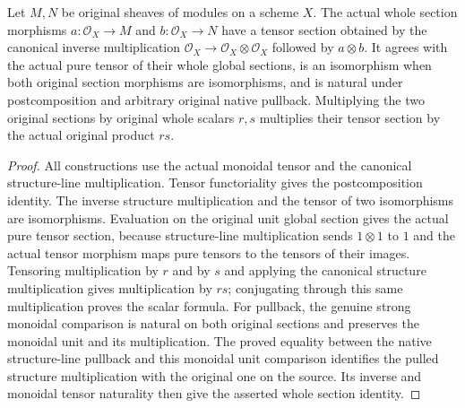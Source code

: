 \begin{lemma}
\label{lem:fc-original-tensor-section-homs}
\leanok
Let $M,N$ be original sheaves of modules on a scheme $X$. The actual
whole section morphisms $a:\mathcal O_X\to M$ and
$b:\mathcal O_X\to N$ have a tensor section obtained by the canonical
inverse multiplication $\mathcal O_X\to\mathcal O_X\otimes\mathcal O_X$
followed by $a\otimes b$. It agrees with the actual pure tensor of their
whole global sections, is an isomorphism when both original section
morphisms are isomorphisms, and is natural under postcomposition and
arbitrary original native pullback. Multiplying the two original
sections by original whole scalars $r,s$ multiplies their tensor section
by the actual original product $rs$.
\end{lemma}
\begin{proof}
All constructions use the actual monoidal tensor and the canonical
structure-line multiplication. Tensor functoriality gives the
postcomposition identity. The inverse structure multiplication and the
tensor of two isomorphisms are isomorphisms. Evaluation on the original
unit global section gives the actual pure tensor section, because
structure-line multiplication sends $1\otimes1$ to $1$ and the actual
tensor morphism maps pure tensors to the tensors of their images.
Tensoring multiplication by $r$ and by $s$ and applying the canonical
structure multiplication gives multiplication by $rs$; conjugating
through this same multiplication proves the scalar formula.
For pullback, the genuine strong monoidal comparison is natural on both
original sections and preserves the monoidal unit and its multiplication.
The proved equality between the native structure-line pullback and
this monoidal unit comparison identifies the pulled structure
multiplication with the original one on the source. Its inverse and
monoidal tensor naturality then give the asserted whole section identity.
\end{proof}
